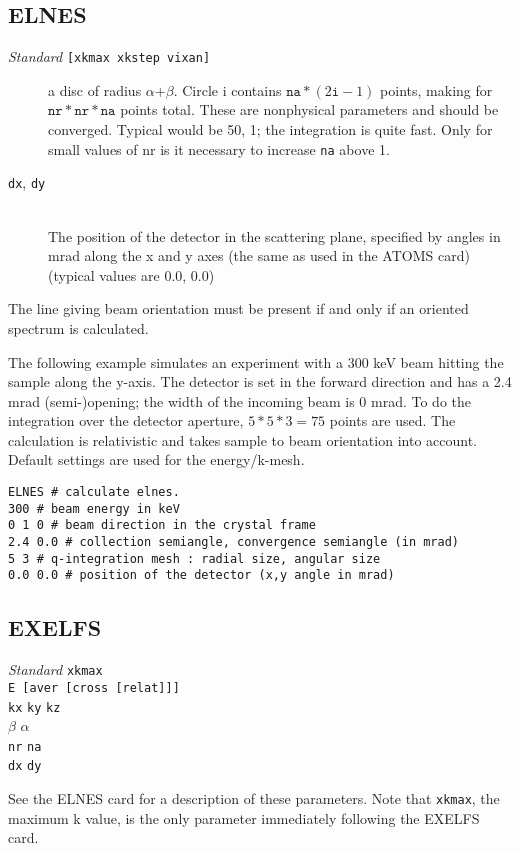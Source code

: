 \documentclass[11pt,oneside]{report} %
\renewcommand{\htmlref}[2]{\hyperlink{#2}{#1}}
\newenvironment{Card}[4]%
      {\vspace{3ex}%
        \subsection{#1}
        \quad\textsl{#3}\newline
        \quad\texttt{#2}\newline%
        \label{card:#4}\\}
      {}
\renewcommand{\htmlref}[2]{{#1}} %
\begin{document}
\begin{Card}{ELNES}{[xkmax xkstep vixan]}{Standard}{eln}
\begin{description}
    a disc of radius $\alpha$+$\beta$. Circle i contains $\mathtt{na}*(2\mathtt{i}-1)$ 
    points, making for $\mathtt{nr}*\mathtt{nr}*\mathtt{na}$ points total.
    These are nonphysical parameters and should be converged. Typical would be 50, 1; the integration is quite fast.  Only for small values of nr is it 
    necessary to increase \texttt{na} above 1.
  \item[\texttt{dx}, \texttt{dy}]\hfill\\ 
    The position of the detector in the scattering plane, specified by angles 
    in mrad along the x and y axes (the same as used in the ATOMS card) (typical 
    values are 0.0, 0.0)
\end{description}

The line giving beam orientation must be present if and only if
 an oriented spectrum is calculated.

The following example simulates an experiment with a 300 keV beam 
hitting the sample along the y-axis. The detector is set in the 
forward direction and has a 2.4 mrad (semi-)opening; the width of 
the incoming beam is 0 mrad. To do the integration over the detector 
aperture, $5*5*3=75$ points are used. The calculation is relativistic 
and takes sample to beam orientation into account. Default settings 
are used for the energy/k-mesh.

\begin{verbatim}
ELNES # calculate elnes.
300 # beam energy in keV
0 1 0 # beam direction in the crystal frame
2.4 0.0 # collection semiangle, convergence semiangle (in mrad)
5 3 # q-integration mesh : radial size, angular size
0.0 0.0 # position of the detector (x,y angle in mrad)
\end{verbatim}
\end{Card}

\begin{Card}{EXELFS}{xkmax}{Standard}{exe}
\texttt{E [aver [cross [relat]]]}\\
\texttt{kx} \texttt{ky} \texttt{kz}\\
$\mathtt{\beta}$ $\mathtt{\alpha}$ \\
\texttt{nr} \texttt{na} \\
\texttt{dx} \texttt{dy}

See the \htmlref{ELNES}{card:eln} card for a description of these 
parameters.  Note that \texttt{xkmax}, the maximum k value, is the only 
parameter immediately following the EXELFS card.
\end{Card}
\end{document}
